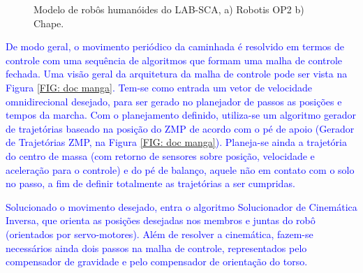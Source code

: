\begin{figure}[phtb]
\centering
	\centering
\caption{Modelo de robôs humanóides do LAB-SCA, a) Robotis OP2 b) Chape.}
\label{FIG:darwinchape}
\end{figure}

\textcolor{blue}{De modo geral, o movimento periódico da caminhada é resolvido em termos de controle com uma sequência de algoritmos que formam uma malha de controle fechada. Uma visão geral da arquitetura da malha de controle pode ser vista na Figura \ref{FIG: doc manga}. Tem-se como entrada um vetor de velocidade omnidirecional desejado, para ser gerado no planejador de passos as posições e tempos da marcha. Com o planejamento definido, utiliza-se um algoritmo gerador de trajetórias baseado na posição do ZMP de acordo com o pé de apoio (Gerador de Trajetórias ZMP, na Figura \ref{FIG: doc manga}). Planeja-se ainda a trajetória do centro de massa (com retorno de sensores sobre posição, velocidade e aceleração para o controle) e do pé de balanço, aquele não em contato com o solo no passo, a fim de definir totalmente as trajetórias a ser cumpridas.}

\textcolor{blue}{Solucionado o movimento desejado, entra o algoritmo Solucionador de Cinemática Inversa, que orienta as posições desejadas nos membros e juntas do robô (orientados por servo-motores). Além de resolver a cinemática, fazem-se necessários ainda dois passos na malha de controle, representados pelo compensador de gravidade e pelo compensador de orientação do torso.}

